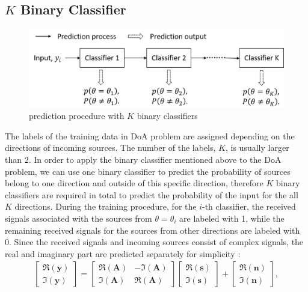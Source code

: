 \documentclass[journal]{IEEEtran}
\begin{document}
\subsection{$K$ Binary Classifier}
\begin{figure}[t]
	\centering
	\includegraphics[width=1\columnwidth]{one_vs_rest_workFlow.png}
	\caption{prediction procedure with $K$ binary classifiers}
	\label{fig:one_vs_rest_workFlow}
\end{figure}
The labels of the training data in DoA problem are assigned depending on the directions of incoming sources.
The number of the labels, $K$, is usually larger than 2. In order to apply the binary classifier mentioned above to the DoA problem, we can use one binary classifier to predict the probability of sources belong to one direction and outside of this specific direction, therefore $K$ binary classifiers are required in total to predict the probability of the input for the all $K$ directions.
During the training procedure, for the $i$-th classifier, the received signals associated with the sources from $\theta = \theta_{i}$ are labeled with 1, while the remaining received signals for the sources from other directions are labeled with 0.
Since the received signals and incoming sources consist of complex signals, the real and imaginary part are predicted separately for simplicity : 
\begin{align} \label{eqt:Yrealandimag}
\begin{bmatrix}
\Re (\mathbf{y})
\\ 
\Im (\mathbf{y})
\end{bmatrix}
= \begin{bmatrix}
\Re(\mathbf{A})  & -\Im(\mathbf{A}) 
 \\ \Im(\mathbf{A}) &  \Re(\mathbf{A})
\end{bmatrix}
\begin{bmatrix}
\Re (\mathbf{s})
\\ 
\Im (\mathbf{s})
\end{bmatrix} +
\begin{bmatrix}
\Re (\mathbf{n})
\\ 
\Im (\mathbf{n})
\end{bmatrix},
\end{align}
\end{document}
